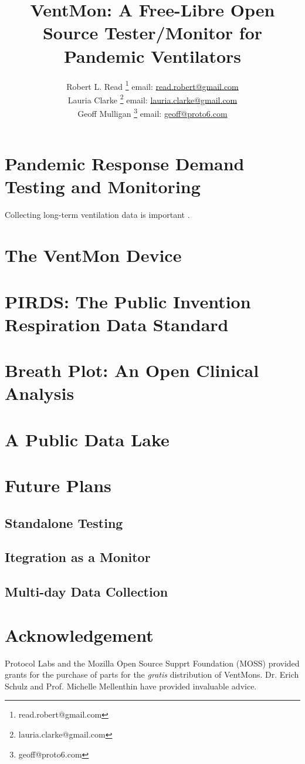 \documentclass{article}
\title{VentMon: A Free-Libre Open Source Tester/Monitor for Pandemic Ventilators}
\author{Robert L. Read
  \thanks{read.robert@gmail.com}
  email: \href{mailto:read.robert@gmail.com}{read.robert@gmail.com}\\
Lauria Clarke
  \thanks{lauria.clarke@gmail.com}
  email: \href{mailto:lauria.clarke@gmail.com}{lauria.clarke@gmail.com}\\
  Geoff Mulligan
  \thanks{geoff@proto6.com }
  email: \href{mailto:geoff@proto6.com }{geoff@proto6.com}
  }
\begin{document}
\maketitle
\begin{abstract}

\end{abstract}


\section{Pandemic Response Demand Testing and Monitoring}

Collecting long-term ventilation data is important
\cite{rehm2018development}.

\section{The VentMon Device}

\section{PIRDS: The Public Invention Respiration Data Standard}

\section{Breath Plot: An Open Clinical Analysis}

\section{A Public Data Lake}

\section{Future Plans}

\subsection{Standalone Testing}

\subsection{Itegration as a Monitor}

\subsection{Multi-day Data Collection}

\section*{Acknowledgement}

Protocol Labs and the Mozilla Open Source Supprt Foundation (MOSS) provided
grants for the purchase of parts for the {\it gratis} distribution of VentMons.
Dr. Erich Schulz and Prof. Michelle Mellenthin have provided invaluable advice.





\end{document}
